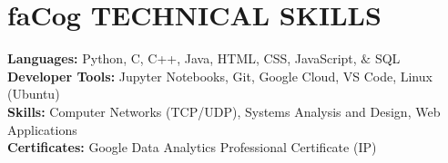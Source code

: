 \documentclass[a4paper,11pt]{article}
\newcommand{\seticon}[1]{\textcolor{Cerulean}{\csname #1\endcsname}}
\begin{document}
\section{\seticon{faCog} \textbf{TECHNICAL SKILLS}} %
\begin{itemize}[leftmargin=0.15in, label={}]
    \small{\item{
     \textbf{Languages:}{ Python, C, C++, Java, HTML, CSS, JavaScript, $\&$ SQL} \\		   
    \textbf{Developer Tools:}{ Jupyter Notebooks, Git, Google Cloud, VS Code, Linux (Ubuntu)}\\
    \textbf{Skills:}{ Computer Networks (TCP/UDP), Systems Analysis and Design, Web Applications}\\ 
    \textbf{Certificates:}{ Google Data Analytics Professional Certificate (IP)}\\
    }}
 \end{itemize} \vspace{-13pt}
\end{document}
